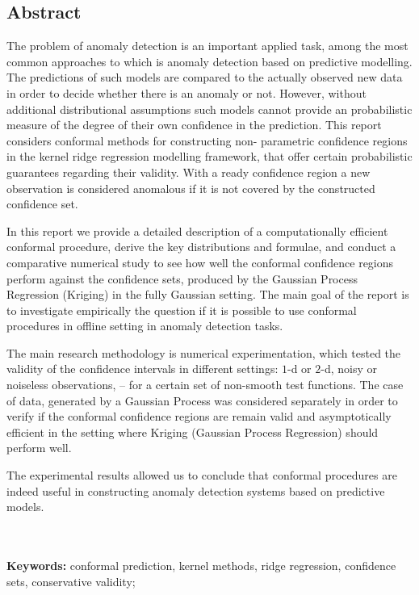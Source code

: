 \documentclass[a4paper,14pt]{extarticle}
\begin{document}
\clearpage
\begin{titlepage}
\thispagestyle{empty}
\section*{Abstract}

The problem of anomaly detection is an important applied task, among the most common
approaches to which is anomaly detection based on predictive modelling. The predictions 
of such models are compared to the actually observed new data in order to decide
whether there is an anomaly or not. However, without additional distributional assumptions
such models cannot provide an probabilistic measure of the degree of their own confidence
in the prediction. This report considers conformal methods for constructing non-
parametric confidence regions in the kernel ridge regression modelling framework,
that offer certain probabilistic guarantees regarding their validity. With a ready
confidence region a new observation is considered anomalous if it is not covered
by the constructed confidence set.

In this report we provide a detailed description of a computationally efficient conformal
procedure, derive the key distributions and formulae, and conduct a comparative numerical
study to see how well the conformal confidence regions perform against the confidence
sets, produced by the Gaussian Process Regression (Kriging) in the fully Gaussian
setting. The main goal of the report is to investigate empirically the question if
it is possible to use conformal procedures in offline setting in anomaly detection
tasks.

The main research methodology is numerical experimentation, which tested the validity
of the confidence intervals in different settings: $1$-d or $2$-d, noisy or noiseless
observations, -- for a certain set of non-smooth test functions. The case of data,
generated by a Gaussian Process was considered separately in order to verify if the
conformal confidence regions are remain valid and asymptotically efficient in the 
setting where Kriging (Gaussian Process Regression) should perform well.

The experimental results allowed us to conclude that conformal procedures are indeed
useful in constructing anomaly detection systems based on predictive models.

\hfill\\\hfill\\
\noindent\textbf{Keywords:} conformal prediction, kernel methods, ridge regression,
confidence sets, conservative validity;
\end{titlepage}
\end{document}
